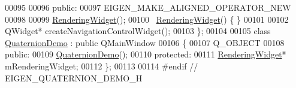 \begin{DoxyCode}
00095 
00096   \textcolor{keyword}{public}: 
00097     EIGEN\_MAKE\_ALIGNED\_OPERATOR\_NEW
00098     
00099     \hyperlink{class_rendering_widget}{RenderingWidget}();
00100     ~\hyperlink{class_rendering_widget}{RenderingWidget}() \{ \}
00101 
00102     QWidget* createNavigationControlWidget();
00103 \};
00104 
00105 \textcolor{keyword}{class }\hyperlink{class_quaternion_demo}{QuaternionDemo} : \textcolor{keyword}{public} QMainWindow
00106 \{
00107   Q\_OBJECT
00108   \textcolor{keyword}{public}:
00109     \hyperlink{class_quaternion_demo}{QuaternionDemo}();
00110   \textcolor{keyword}{protected}:
00111     \hyperlink{class_rendering_widget}{RenderingWidget}* mRenderingWidget;
00112 \};
00113 
00114 \textcolor{preprocessor}{#endif // EIGEN\_QUATERNION\_DEMO\_H}
\end{DoxyCode}
